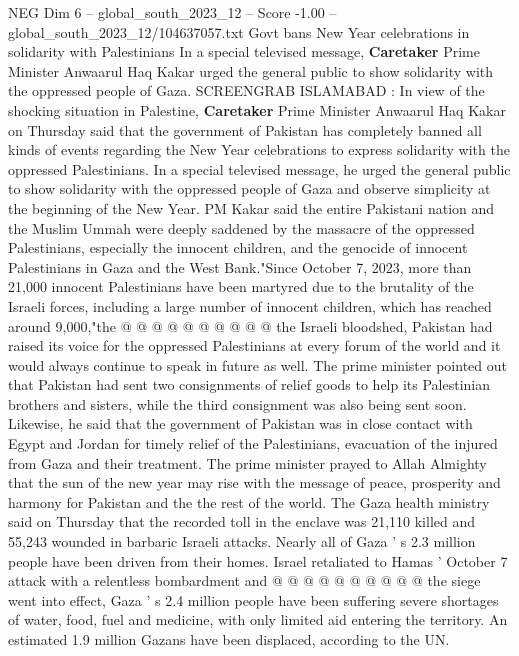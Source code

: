 \begin{textsample}{NEG Dim 6 – global\_south\_2023\_12 – Score -1.00 – global\_south\_2023\_12/104637057.txt}  \label{ex:f6_neg_354}
Govt bans New Year celebrations in solidarity with Palestinians In a special televised message, \textbf{Caretaker} Prime Minister Anwaarul Haq Kakar urged the general public to show solidarity with the oppressed people of Gaza.
SCREENGRAB ISLAMABAD : In view of the shocking situation in Palestine, \textbf{Caretaker} Prime Minister Anwaarul Haq Kakar on Thursday said that the government of Pakistan has completely banned all kinds of events regarding the New Year celebrations to express solidarity with the oppressed Palestinians.
In a special televised message, he urged the general public to show solidarity with the oppressed people of Gaza and observe simplicity at the beginning of the New Year.
PM Kakar said the entire Pakistani nation and the Muslim Ummah were deeply saddened by the massacre of the oppressed Palestinians, especially the innocent children, and the genocide of innocent Palestinians in Gaza and the West Bank."Since October 7, 2023, more than 21,000 innocent Palestinians have been martyred due to the brutality of the Israeli forces, including a large number of innocent children, which has reached around 9,000,"the @ @ @ @ @ @ @ @ @ @ the Israeli bloodshed, Pakistan had raised its voice for the oppressed Palestinians at every forum of the world and it would always continue to speak in future as well.
The prime minister pointed out that Pakistan had sent two consignments of relief goods to help its Palestinian brothers and sisters, while the third consignment was also being sent soon.
Likewise, he said that the government of Pakistan was in close contact with Egypt and Jordan for timely relief of the Palestinians, evacuation of the injured from Gaza and their treatment.
The prime minister prayed to Allah Almighty that the sun of the new year may rise with the message of peace, prosperity and harmony for Pakistan and the the rest of the world.
The Gaza health ministry said on Thursday that the recorded toll in the enclave was 21,110 killed and 55,243 wounded in barbaric Israeli attacks.
Nearly all of Gaza ' s 2.3 million people have been driven from their homes.
Israel retaliated to Hamas ' October 7 attack with a relentless bombardment and @ @ @ @ @ @ @ @ @ @ the siege went into effect, Gaza ' s 2.4 million people have been suffering severe shortages of water, food, fuel and medicine, with only limited aid entering the territory.
An estimated 1.9 million Gazans have been displaced, according to the UN.

\end{textsample}

